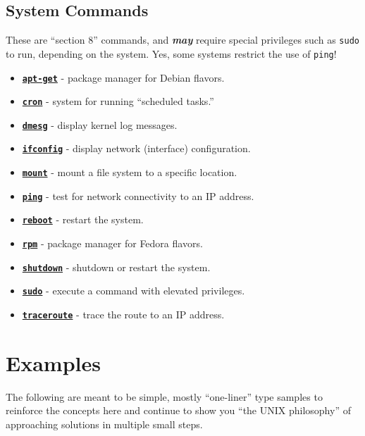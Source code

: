 \documentclass[10pt,]{book}
\numberwithin{figure}{chapter}
\begin{document}
\subsection{System Commands}\label{system-commands}

These are ``section 8'' commands, and \textbf{\emph{may}} require
special privileges such as \texttt{sudo} to run, depending on the
system. Yes, some systems restrict the use of \texttt{ping}!

\begin{itemize}
\item
  \href{http://linux.die.net/man/8/apt-get}{\textbf{\texttt{apt-get}}} -
  package manager for Debian flavors.
\item
  \href{http://linux.die.net/man/8/cron}{\textbf{\texttt{cron}}} -
  system for running ``scheduled tasks.''
\item
  \href{http://linux.die.net/man/8/dmesg}{\textbf{\texttt{dmesg}}} -
  display kernel log messages.
\item
  \href{http://linux.die.net/man/8/ifconfig}{\textbf{\texttt{ifconfig}}}
  - display network (interface) configuration.
\item
  \href{http://linux.die.net/man/8/mount}{\textbf{\texttt{mount}}} -
  mount a file system to a specific location.
\item
  \href{http://linux.die.net/man/8/ping}{\textbf{\texttt{ping}}} - test
  for network connectivity to an IP address.
\item
  \href{http://linux.die.net/man/8/reboot}{\textbf{\texttt{reboot}}} -
  restart the system.
\item
  \href{http://linux.die.net/man/8/rpm}{\textbf{\texttt{rpm}}} - package
  manager for Fedora flavors.
\item
  \href{http://linux.die.net/man/8/shutdown}{\textbf{\texttt{shutdown}}}
  - shutdown or restart the system.
\item
  \href{http://linux.die.net/man/8/sudo}{\textbf{\texttt{sudo}}} -
  execute a command with elevated privileges.
\item
  \href{http://linux.die.net/man/8/traceroute}{\textbf{\texttt{traceroute}}}
  - trace the route to an IP address.
\end{itemize}

\section{Examples}\label{examples}

The following are meant to be simple, mostly ``one-liner'' type samples
to reinforce the concepts here and continue to show you ``the UNIX
philosophy'' of approaching solutions in multiple small steps.
\end{document}
